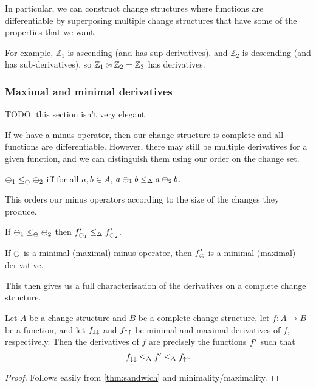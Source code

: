 In particular, we can construct change structures where functions are
differentiable by superposing multiple change structures that have some of the
properties that we want.

For example, $\mathbb{Z}_1$ is ascending (and has sup-derivatives), and
$\mathbb{Z}_2$ is descending (and has sub-derivatives), so $\mathbb{Z}_1
\circledast \mathbb{Z}_2 = \mathbb{Z}_3$ has derivatives.

\subsubsection{Maximal and minimal derivatives}

TODO: this section isn't very elegant

If we have a minus operator, then our change structure is complete and all
functions are differentiable. However, there may still be multiple derivatives
for a given function, and we can distinguish them using our order on the change
set.

\begin{defn}
  $\ominus_1 \leq_\ominus \ominus_2$ iff for all $a,b \in A$, $a \ominus_1 b
  \leq_\Delta a \ominus_2 b$.
\end{defn}

This orders our minus operators according to the size of the changes they
produce. 

\begin{prop}
  If $\ominus_1 \leq_\ominus \ominus_2$ then
  $f'_{\ominus_1} \leq_\Delta f'_{\ominus_2}$.
\end{prop}

\begin{prop}
  If $\ominus$ is a minimal (maximal) minus operator, then $f'_\ominus$
  is a minimal (maximal) derivative.
\end{prop}

This then gives us a full characterisation of the derivatives on a complete
change structure.

\begin{thm}
\label{thm:derivativeCharacterization}
  Let $A$ be a change structure and $B$ be a complete change structure, let
  $f: A \rightarrow B$ be a function, and let $f_{\downarrow\downarrow}$ and
  $f_{\uparrow\uparrow}$ be minimal and maximal derivatives of $f$, respectively.
  Then the derivatives of $f$ are precisely
  the functions $f'$ such that
  $$f_{\downarrow\downarrow} \leq_\Delta f' \leq_\Delta f_{\uparrow\uparrow}$$
\end{thm}
\begin{proof}
  Follows easily from \cref{thm:sandwich} and minimality/maximality.
\end{proof}

